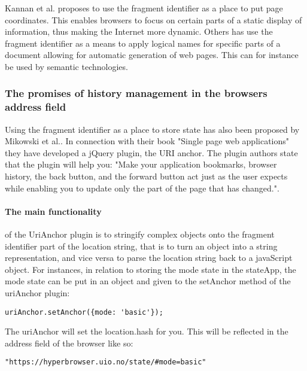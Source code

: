 \documentclass[english]{ifimaster}
\begin{document}
Kannan et al. proposes to use the fragment identifier as a place to put page coordinates. This enables browsers to focus on certain parts of a static display of information, thus making the Internet more dynamic\parencite{Kannan:2006:LUB:1135777.1135924}. Others has use the fragment identifier as a means to apply logical names for specific parts of a document allowing for automatic generation of web pages\parencite{Aimar199599}. This can for instance be used by semantic technologies. 

\subsubsection{The promises of history management in the browsers address field}
Using the fragment identifier as a place to store state has also been proposed by Mikowski et al.\parencite{mikowski}. In connection with their book "Single page web applications" they have developed a jQuery plugin, the URI anchor. The plugin authors state that the plugin will help you: "Make your application bookmarks, browser history, the back button, and the forward button act just as the user expects while enabling you to update only the part of the page that has changed."\parencite{urianchor}.   

\paragraph{The main functionality}of the UriAnchor plugin is to stringify complex objects onto the fragment identifier part of the location string, that is to turn an object into a string representation, and vice versa to parse the location string back to a javaScript object. For instances, in relation to storing the mode state in the stateApp, the mode state can be put in an object and given to the setAnchor method of the uriAnchor plugin:

\begin{lstlisting}[caption=Setting the location with the Uri Anchor plugin]
	uriAnchor.setAnchor({mode: 'basic'}); 
\end{lstlisting}


The uriAnchor will set the location.hash for you. This will be reflected in the address field of the browser like so: 
\begin{lstlisting}[caption=The browsers address field after using the setAnchor 
method of the uriAnchor plugin]
	"https://hyperbrowser.uio.no/state/#mode=basic"
\end{lstlisting}
\end{document}
